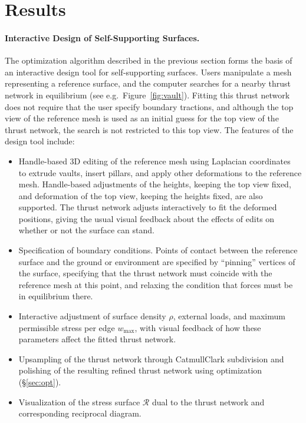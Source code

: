 \documentclass[review]{acmsiggraph}
\def\RR{{\mathcal R}}
\newcommand{\secref}[1]{(\S\ref{#1})}
\begin{document}
\section{Results}
\label{sec:design}

\paragraph{Interactive Design of Self-Supporting Surfaces.}

The optimization algorithm described in the previous section forms the 
basis of an interactive design tool for self-supporting surfaces. Users 
manipulate a mesh representing a reference surface, and the computer 
searches for a nearby thrust network in equilibrium (see e.g.\ 
Figure~\ref{fig:vault}). Fitting this thrust network does not require that 
the user specify boundary tractions, and although the top view of the 
reference mesh is used as an initial guess for the top view of the thrust 
network, the search is not restricted to this top view. The features of 
the design tool include:

\begin{itemize}\itemsep-\parsep

\item Handle-based 3D editing of the reference mesh using Laplacian 
coordinates~\cite{Lipman2004,Sorkine2003} to extrude vaults, insert 
pillars, and apply other deformations to the reference mesh. Handle-based 
adjustments of the heights, keeping the top view fixed, and deformation of 
the top view, keeping the heights fixed, are also supported. The thrust 
network adjusts interactively to fit the deformed positions, giving the 
usual visual feedback about the effects of edits on whether or not the 
surface can stand.

\item Specification of boundary conditions. Points of contact between the 
reference surface and the ground or environment are specified by 
``pinning'' vertices of the surface, specifying that the thrust network 
must coincide with the reference mesh at this point, and relaxing the 
condition that forces must be in equilibrium there.

\item Interactive adjustment of surface density $\rho$, external loads, 
and maximum permissible stress per edge $w_{\textrm{max}}$, with visual 
feedback of how these parameters affect the fitted thrust network.

\item Upsampling of the thrust network through Catmull\dash Clark 
subdivision \nix{\cite{catmull78}}
and polishing of the resulting refined thrust 
network using optimization \secref{sec:opt}.

\item Visualization of the stress surface $\RR$ dual to the thrust network 
and corresponding reciprocal diagram.

\end{itemize}
\end{document}
